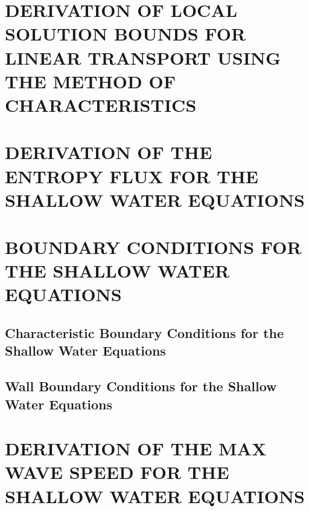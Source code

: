 \begin{appendices}
\renewcommand{\appendixname}{APPENDIX}

\chapter{DERIVATION OF LOCAL SOLUTION BOUNDS FOR LINEAR TRANSPORT USING
  THE METHOD OF CHARACTERISTICS
  \label{sec:analytic_dmp}}
  
\chapter{DERIVATION OF THE ENTROPY FLUX FOR THE SHALLOW WATER EQUATIONS
\label{sec:shallow_water_entropy_flux}}
  
\chapter{BOUNDARY CONDITIONS FOR THE SHALLOW WATER EQUATIONS
\label{sec:boundary_conditions}}
  \section{Characteristic Boundary Conditions for the Shallow Water Equations}
    
  \section{Wall Boundary Conditions for the Shallow Water Equations}
    
\chapter{DERIVATION OF THE MAX WAVE SPEED FOR THE SHALLOW WATER EQUATIONS
\label{app:shallow_water_max_wave_speed}}
  

\end{appendices}
